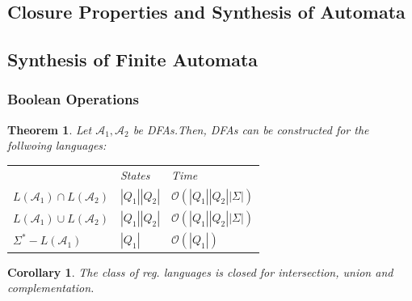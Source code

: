 \documentclass[a3paper, 8pt]{extarticle}
\newtheorem{theorem}{Theorem}[section]
\newtheorem{corollary}{Corollary}[theorem]
\begin{document}
\begin{multicols*}{6}
\subsection{Closure Properties and Synthesis of Automata}
\subsection{Synthesis of Finite Automata}
\subsubsection{Boolean Operations}
\begin{theorem}
    Let $\mathcal{A}_1, \mathcal{A}_2$ be DFAs.Then, DFAs can be constructed for the follwoing languages: 
    \begin{tabular}{l l l}
         &  States & Time \\
        $L(\mathcal{A}_1) \cap L(\mathcal{A}_2)$ & $|Q_1||Q_2|$ &  $\mathcal{O}(|Q_1||Q_2||\Sigma|)$\\
        $L(\mathcal{A}_1) \cup L(\mathcal{A}_2)$ & $|Q_1||Q_2|$ &  $\mathcal{O}(|Q_1||Q_2||\Sigma|)$\\
        $\Sigma^* - L(\mathcal{A}_1)$ & $|Q_1|$ & $\mathcal{O}(|Q_1|)$
    \end{tabular}
\end{theorem}

\begin{corollary}
    The class of reg. languages is closed for intersection, union and complementation.
\end{corollary}



\end{multicols*}
\end{document}
